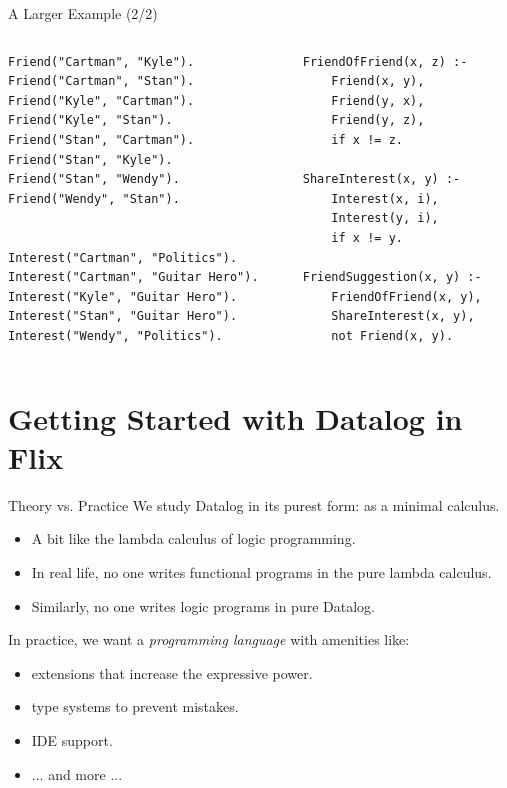\begin{frame}[fragile]{A Larger Example (2/2)}
\begin{columns}
\begin{column}{.5\textwidth}
\begin{lstlisting}[language=flix]
Friend("Cartman", "Kyle").
Friend("Cartman", "Stan").
Friend("Kyle", "Cartman").
Friend("Kyle", "Stan").
Friend("Stan", "Cartman").
Friend("Stan", "Kyle").
Friend("Stan", "Wendy").
Friend("Wendy", "Stan").


Interest("Cartman", "Politics").
Interest("Cartman", "Guitar Hero").
Interest("Kyle", "Guitar Hero").
Interest("Stan", "Guitar Hero").
Interest("Wendy", "Politics").
\end{lstlisting}
\end{column}
\begin{column}{.5\textwidth}
\begin{lstlisting}[language=flix]
FriendOfFriend(x, z) :- 
    Friend(x, y), 
    Friend(y, x), 
    Friend(y, z), 
    if x != z.

ShareInterest(x, y) :- 
    Interest(x, i), 
    Interest(y, i), 
    if x != y.

FriendSuggestion(x, y) :- 
    FriendOfFriend(x, y), 
    ShareInterest(x, y), 
    not Friend(x, y).
\end{lstlisting}
\end{column}
\end{columns}
\end{frame}

\section{Getting Started with Datalog in Flix}

\begin{frame}{Theory vs. Practice}
We study Datalog in its purest form: as a minimal calculus.
\begin{itemize}
    \item A bit like the lambda calculus of logic programming. 
    \item In real life, no one writes functional programs in the pure lambda calculus. 
    \item Similarly, no one writes logic programs in pure Datalog.
\end{itemize}

\pause

In practice, we want a \emph{programming language} with amenities like:
\begin{itemize}
    \item extensions that increase the expressive power.
    \item type systems to prevent mistakes.
    \item IDE support.
    \item ... and more ...
\end{itemize}
\end{frame}

